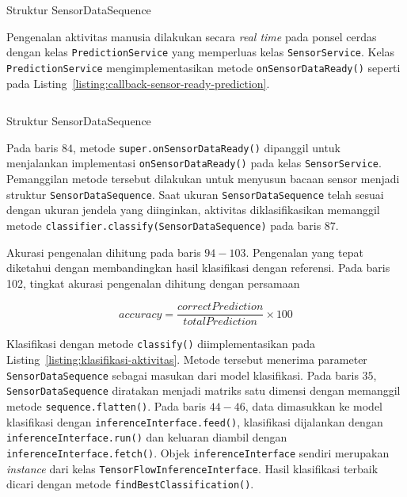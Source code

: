 \begin{listing}[h]
    \inputminted[firstline=46,firstnumber=46,lastline=56,gobble=4]{java}{../aktvtas/app/src/main/java/org/elins/aktvtas/sensor/SensorService.java}
    \caption{Struktur SensorDataSequence}
    \label{listing:callback-sensor-ready}
\end{listing}

Pengenalan aktivitas manusia dilakukan secara \textit{real time} pada ponsel cerdas dengan kelas \texttt{PredictionService} yang memperluas kelas \texttt{SensorService}. Kelas \texttt{PredictionService} mengimplementasikan metode \texttt{onSensorDataReady()} seperti pada Listing~\ref{listing:callback-sensor-ready-prediction}.

\begin{listing}[h]
    \inputminted[firstline=82,firstnumber=82,lastline=103,gobble=4]{java}{../aktvtas/app/src/main/java/org/elins/aktvtas/PredictionService.java}
    \caption{Struktur SensorDataSequence}
    \label{listing:callback-sensor-ready-prediction}
\end{listing}

Pada baris $84$, metode \texttt{super.onSensorDataReady()} dipanggil untuk menjalankan implementasi \texttt{onSensorDataReady()} pada kelas \texttt{SensorService}. Pemanggilan metode tersebut dilakukan untuk menyusun bacaan sensor menjadi struktur \texttt{SensorDataSequence}. Saat ukuran \texttt{SensorDataSequence} telah sesuai dengan ukuran jendela yang diinginkan, aktivitas diklasifikasikan memanggil metode \texttt{classifier.classify(SensorDataSequence)} pada baris $87$.

Akurasi pengenalan dihitung pada baris $94-103$. Pengenalan yang tepat diketahui dengan membandingkan hasil klasifikasi dengan referensi. Pada baris 102, tingkat akurasi pengenalan dihitung dengan persamaan

\begin{equation}
    accuracy = \frac{correctPrediction}{totalPrediction} \times 100
\end{equation}

Klasifikasi dengan metode \texttt{classify()} diimplementasikan pada Listing~\ref{listing:klasifikasi-aktivitas}. Metode tersebut menerima parameter \texttt{SensorDataSequence} sebagai masukan dari model klasifikasi. Pada baris $35$, \texttt{SensorDataSequence} diratakan menjadi matriks satu dimensi dengan memanggil metode \texttt{sequence.flatten()}. Pada baris $44-46$, data dimasukkan ke model klasifikasi dengan \texttt{inferenceInterface.feed()}, klasifikasi dijalankan dengan \texttt{inferenceInterface.run()} dan keluaran diambil dengan \texttt{inferenceInterface.fetch()}. Objek \texttt{inferenceInterface} sendiri merupakan \textit{instance} dari kelas \texttt{TensorFlowInferenceInterface}. Hasil klasifikasi terbaik dicari dengan metode \texttt{findBestClassification()}.

